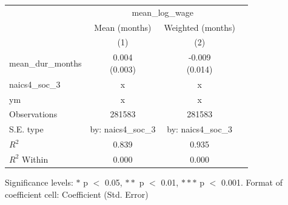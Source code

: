 \renewcommand\cellalign{t}
\begin{threeparttable}
\begin{tabular}{lccc}
\toprule
 & \multicolumn{2}{c}{mean_log_wage} \\
\cmidrule(lr){2-3} 
 & Mean (months) & Weighted (months) \\
 & (1) & (2) \\
\midrule
\addlinespace
mean_dur_months & \makecell{0.004 \\ (0.003)} & \makecell{-0.009 \\ (0.014)} \\
\midrule
\addlinespace
naics4_soc_3 & x & x \\
ym & x & x \\
\midrule
\addlinespace
Observations & 281583 & 281583 \\
S.E. type & by: naics4_soc_3 & by: naics4_soc_3 \\
$R^2$ & 0.839 & 0.935 \\
$R^2$ Within & 0.000 & 0.000 \\
\bottomrule
\end{tabular}
\footnotesize Significance levels: $*$ p $<$ 0.05, $**$ p $<$ 0.01, $***$ p $<$ 0.001. Format of coefficient cell: Coefficient 
 (Std. Error)
\end{threeparttable}